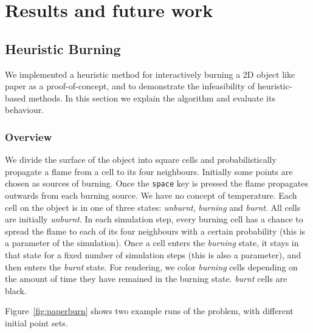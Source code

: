\documentclass[12pt]{report}
\begin{document}
\chapter{Results and future work}

\section{Heuristic Burning}

We implemented a heuristic method for interactively burning a 2D object like paper as a proof-of-concept, and to demonstrate the infeasibility of heuristic-based methods. In this section we explain the algorithm and evaluate its behaviour.

\subsection{Overview}

We divide the surface of the object into square cells and probabilistically propagate a flame from a cell to its four neighbours. Initially some points are chosen as sources of burning. Once the \texttt{space} key is pressed the flame  propagates outwards from each burning source. We have no concept of temperature. Each cell on the object is in one of three states: \textit{unburnt}, \textit{burning} and \textit{burnt}. All cells are initially \textit{unburnt}. In each simulation step, every burning cell has a chance to spread the flame to each of its four neighbours with a certain probability (this is a parameter of the simulation). Once a cell enters the \textit{burning} state, it stays in that state for a fixed number of simulation steps (this is also a parameter), and then enters the \textit{burnt} state. For rendering, we color \textit{burning} cells depending on the amount of time they have remained in the burning state. \textit{burnt} cells are black.

Figure~\ref{fig:paperburn} shows two example runs of the problem, with different initial point sets.
\end{document}

